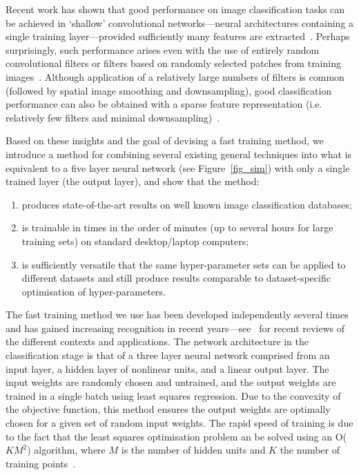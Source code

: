 \documentclass[conference]{IEEEtran}
\begin{document}
Recent work has shown that good performance on image classification tasks can be achieved in `shallow' convolutional networks---neural architectures containing a single training layer---provided sufficiently many features are extracted~\cite{Coates.11}. Perhaps surprisingly, such performance arises even with the use of entirely random convolutional filters or filters based on randomly selected patches from training images~\cite{Coates.11a}. Although application of a relatively large numbers of filters is common (followed by spatial image smoothing and downsampling), good classification performance can also be obtained with a sparse feature representation (i.e. relatively few filters and minimal downsampling)~\cite{Le.10}.

Based on these insights and the goal of devising a fast training method, we introduce a method for combining several existing general techniques into what is equivalent to a five layer neural network (see Figure~\ref{fig_sim}) with only a single trained layer (the output layer), and show that the method:
\begin{enumerate}
\item produces state-of-the-art results on  well known image classification databases;
\item is trainable in times in the order of minutes (up to several hours for large training sets) on standard desktop/laptop  computers;
\item is sufficiently versatile that the same hyper-parameter sets can be applied to different datasets and still produce results comparable to dataset-specific optimisation of hyper-parameters.
\end{enumerate}

The fast training method  we use has been developed independently several times~\cite{Schmidt.92,Chen.96,Eliasmith,Huang.04} and has gained increasing recognition in recent years---see~\cite{Eliasmith.12,Stewart.14a,Huang.12,Huang.14} for recent reviews of the different contexts and applications. The network architecture  in the classification stage is that of a three layer neural network comprised from an input layer, a hidden layer of nonlinear units, and a linear output layer. The input weights are randomly chosen and untrained, and the output weights are trained in a single batch using least squares regression. Due to the convexity of the objective function, this method ensures the output weights are optimally chosen for a given set of random input weights. The rapid speed of training is due to the fact that the least squares optimisation problem an be solved using an O($KM^2$) algorithm, where $M$ is the number of hidden units and $K$ the number of training points~\cite{McDonnell.15PLOS}. 
\end{document}
